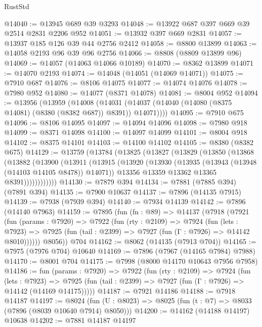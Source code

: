 \begin{lexlean}{RustStd}
\begin{coremodule}
{\begin{coremodule}
{{{{{{{{{{{{{{{{{{{{{{{{{{{{{{{{{{{{{{{{{{{{{{{{{{@14040 := @13945 @689 @39 @3293
@14048 := @13922 @687 @397 @669 @39 @2514 @2831 @2206 @952
@14051 := @13932 @397 @669 @2831
@14057 := @13937 @185 @126 @39 @44 @2756 @2412
@14058 := @8800 @13899
@14063 := @14058 @2193 @96 @39 @96 @2756
@14066 := @8808 (@8809 @13899 @96)
@14069 := @14057 (@14063 @14066 @10189)
@14070 := @8362 @13899
@14071 := @14070 @2193
@14074 := @14048 (@14051 (@14069 @14071))
@14075 := @7910 @687
@14076 := @8106 @14075
@14077 := @14074 @14076
@14078 := @7980 @952
@14080 := @14077 (@8371 @14078)
@14081 := @8004 @952
@14094 := @13956
    (@13959
      (@14008 (@14031 (@14037 (@14040 (@14080 (@8375 @14081) (@8380 (@8382 @687)) @8391)) @14071))))
@14095 := @7910 @675
@14096 := @8106 @14095
@14097 := @14094 @14096
@14098 := @7980 @918
@14099 := @8371 @14098
@14100 := @14097 @14099
@14101 := @8004 @918
@14102 := @8375 @14101
@14103 := @14100 @14102
@14105 := @8380 (@8382 @675)
@14129 := @13759
    (@13784
      (@13825
        (@13827
          (@13829
            (@13850
              (@13868
                (@13882
                  (@13900
                    (@13911
                      (@13915
                        (@13920
                          (@13930
                            (@13935 (@13943 (@13948 (@14103 @14105 @8478)) @14071))
                            @13356
                            @13359
                            @13362
                            @13365
                            @8391))))))))))))
@14130 := @7879 @394
@14134 := @7881 (@7885 @394) (@7891 @394)
@14135 := @7900 @10637
@14137 := @7896 (@14135 @7915)
@14139 := @7938 (@7939 @394)
@14140 := @7934 @14139
@14142 := @7896 (@14140 @7963)
@14159 := @7895
    (fun (fn : @89) =>
    @14137
      (@7918
        (@7921
          (fun (params : @7920) =>
          @7922
            (fun (rty : @2109) =>
            @7924
              (fun (lets : @7923) =>
              @7925 (fun (tail : @2399) => @7927 (fun (Γ : @7926) => @14142 @8010))))))
        @8056))
    @704
@14162 := @8062 (@14135 (@7913 @704))
@14165 := @7975 (@7976 @704) @10640
@14169 := @7896 (@7967 (@14165 @7984) @7988)
@14170 := @8001 @704
@14175 := @7998 (@8000 @14170 @10643 @7956 @7958)
@14186 := fun (params : @7920) =>
  @7922
    (fun (rty : @2109) =>
    @7924
      (fun (lets : @7923) =>
      @7925 (fun (tail : @2399) => @7927 (fun (Γ : @7926) => @14142 (@14169 @14175)))))
@14187 := @7921 @14186
@14188 := @7918 @14187
@14197 := @8024
    (fun (U : @8023) => @8025 (fun (t : @7) => @8033 (@7896 (@8039 @10640 @7914) @8050)))
@14200 := @14162 (@14188 @14197) @10638
@14202 := @7881 @14187 @14197
}}}}}}}}}}}}}}}}}}}}}}}}}}}}}}}}}}}}}}}}}}}}}}}}}}
\end{coremodule}}
\end{coremodule}
\end{lexlean}
